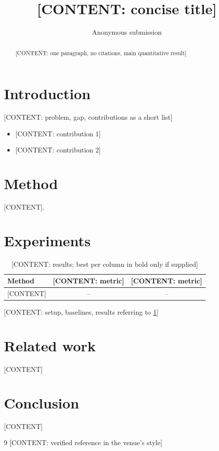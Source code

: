 \documentclass[10pt,a4paper,twocolumn]{article}
\title{[CONTENT: concise title]}
\author{\ifreview Anonymous submission\else [CONTENT: authors and affiliations]\fi}
\date{}
\newif\ifreview \reviewtrue %
\begin{document}
\maketitle

\begin{abstract}
{}[CONTENT: one paragraph, no citations, main quantitative result]
\end{abstract}

\section{Introduction}
{}[CONTENT: problem, gap, contributions as a short list]
\begin{itemize}\setlength{\itemsep}{0pt}
  \item {}[CONTENT: contribution 1]
  \item {}[CONTENT: contribution 2]
\end{itemize}

\section{Method}
\begin{algorithm}[htb]
\caption{[CONTENT: algorithm name]}\label{alg:main}
\begin{algorithmic}[1]
\State {}
\end{algorithmic}
\end{algorithm}
 [CONTENT].

\section{Experiments}
\begin{table}[htb]
\centering\small
\caption{[CONTENT: results; best per column in bold only if supplied]}\label{tab:res}
\begin{tabular}{lcc}
\toprule
Method & [CONTENT: metric] & [CONTENT: metric] \\
\midrule
{}[CONTENT] & -- & -- \\
\bottomrule
\end{tabular}
\end{table}
{}[CONTENT: setup, baselines, results referring to \cref{tab:res}]

\section{Related work}
{}[CONTENT]

\section{Conclusion}
{}[CONTENT]

\ifreview\else\section*{Acknowledgments}[CONTENT]\fi

\begin{thebibliography}{9}\small
{} [CONTENT: verified reference in the venue's style]
\end{thebibliography}
\end{document}
